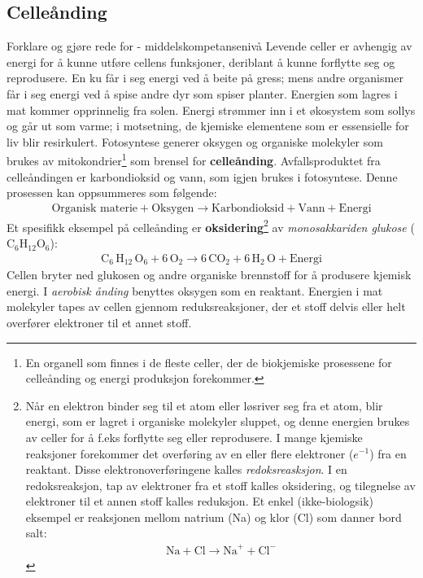 \documentclass[main.tex]{subfiles}
\begin{document}
\subsection{Celleånding}
{\color{Blue}Forklare og gjøre rede for - middelskompetansenivå}
\newline\newline
Levende celler er avhengig av energi for å kunne utføre cellens funksjoner, deriblant å kunne forflytte seg og reprodusere. En ku får i seg energi ved å beite på gress; mens andre organismer får i seg energi ved å spise andre dyr som spiser planter. Energien som lagres i mat kommer opprinnelig fra solen. Energi strømmer inn i et økosystem som sollys og går ut som varme; i motsetning, de kjemiske elementene som er essensielle for liv blir resirkulert. Fotosyntese generer oksygen og organiske molekyler som brukes av mitokondrier\footnote{En organell som finnes i de fleste celler, der de biokjemiske prosessene for celleånding og energi produksjon forekommer.} som brensel for \textbf{celleånding}. Avfallsproduktet fra celleåndingen er karbondioksid og vann, som igjen brukes i fotosyntese. Denne prosessen kan oppsummeres som følgende:
\begin{align*}
\text{Organisk materie} + \text{Oksygen} \longrightarrow \text{Karbondioksid} + \text{Vann} + \text{Energi}
\end{align*}
Et spesifikk eksempel på celleånding er \textbf{oksidering}\footnote{
    Når en elektron binder seg til et atom eller løsriver seg fra et atom, blir energi, som er lagret i organiske molekyler sluppet, og denne energien brukes av celler for å f.eks forflytte seg eller reprodusere. I mange kjemiske reaksjoner forekommer det overføring av en eller flere elektroner ($e^{-1}$) fra en reaktant. Disse elektronoverføringene kalles \emph{redoksreasksjon}. I en redoksreaksjon, tap av elektroner fra et stoff kalles oksidering, og tilegnelse av elektroner til et annen stoff kalles reduksjon. Et enkel (ikke-biologsik) eksempel er reaksjonen mellom natrium (Na) og klor (Cl) som danner bord salt: 
    \begin{align*} 
        \text{Na} + \text{Cl} \longrightarrow \text{Na}^+ + \text{Cl}^-
    \end{align*}} 
av \emph{monosakkariden glukose} ($\text{C}_6 \text{H}_{12} \text{O}_6$):
\begin{align}
\label{celleånding}
\text{C}_6\, \text{H}_{12}\, \text{O}_6 + 6\, \text{O}_2 \longrightarrow 6\, \text{CO}_2 + 6\, \text{H}_2\, \text{O} + \text{Energi}
\end{align}
Cellen bryter ned glukosen og andre organiske brennstoff for å produsere kjemisk energi. I \emph{aerobisk ånding} benyttes oksygen som en reaktant. Energien i mat molekyler tapes av cellen gjennom reduksreaksjoner, der et stoff delvis eller helt overfører elektroner til et annet stoff.
\end{document}
